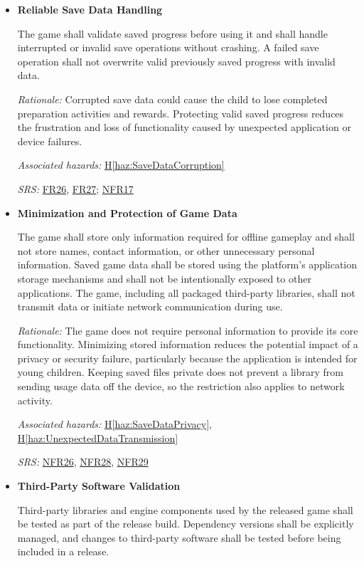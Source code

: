 \documentclass{article}
\newcounter{hazard}
\newcommand{\hazref}[1]{\hyperref[haz:#1]{H\ref*{haz:#1}}}
\newcounter{sr}
\newcommand{\srdef}[1]{\refstepcounter{sr}\label{sr:#1}\textbf{SR-\thesr:}}
\newcommand{\srsurl}{https://team-hindsight.github.io/ophthamology-game/SRS-IEEE/SRS.pdf}
\newcommand{\srsfrref}[2]{\href{\srsurl\#nameddest=#1}{FR#2}}
\newcommand{\srsnfrref}[2]{\href{\srsurl\#nameddest=#1}{NFR#2}}
\begin{document}
\begin{itemize}[leftmargin=1.5cm, labelwidth=1.3cm, labelsep=0.2cm,
  align=left, itemsep=1.2em, parsep=0.6em]
\item[\srdef{ReliableSaveData}]
\textbf{Reliable Save Data Handling}

The game shall validate saved progress before
using it and shall handle interrupted or invalid
save operations without crashing. A failed save
operation shall not overwrite valid previously
saved progress with invalid data.

\textit{Rationale:}
Corrupted save data could cause the child to
lose completed preparation activities and rewards.
Protecting valid saved progress reduces the
frustration and loss of functionality caused by
unexpected application or device failures.

\textit{Associated hazards:}
\hazref{SaveDataCorruption}

\textit{SRS:} \srsfrref{FR_PersistState}{26}, \srsfrref{FR_CorruptData}{27}; \srsnfrref{NFR_Reliability}{17}

\item[\srdef{MinimalSaveData}]
\textbf{Minimization and Protection of Game Data}

The game shall store only information required
for offline gameplay and shall not store names,
contact information, or other unnecessary
personal information. Saved game data shall be
stored using the platform's application storage
mechanisms and shall not be intentionally exposed
to other applications.
The game, including all packaged third-party libraries,
shall not transmit data or initiate network communication
during use.

\textit{Rationale:}
The game does not require personal information
to provide its core functionality. Minimizing
stored information reduces the potential impact
of a privacy or security failure, particularly
because the application is intended for young
children.
Keeping saved files private does not prevent a library
from sending usage data off the device, so the restriction
also applies to network activity.

\textit{Associated hazards:}
\hazref{SaveDataPrivacy}, \hazref{UnexpectedDataTransmission}

\textit{SRS:} \srsnfrref{NFR_DataProtection}{26}, \srsnfrref{NFR_Privacy}{28}, \srsnfrref{NFR_Minimization}{29}

\item[\srdef{ThirdPartyValidation}]
\textbf{Third-Party Software Validation}

Third-party libraries and engine components
used by the released game shall be tested as
part of the release build. Dependency versions
shall be explicitly managed, and changes to
third-party software shall be tested before
being included in a release.


\end{itemize}
\end{document}
